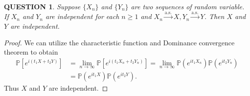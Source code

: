 \documentclass[12pt]{article}
\renewcommand{\(}{\left(}%
\renewcommand{\)}{\right)}%
\renewcommand{\[}{\left[}%
\renewcommand{\]}{\right]}%
\newcommand{\p}{\mathbb{P}}
\newtheorem{question}{QUESTION}[section]}
\newtheorem{proof}{Proof.}}
\begin{document}
  \begin{question}
   Suppose $\{X_n\}$ and $\{Y_n\}$ are two sequences of random variable. If $X_n$ and $Y_n$ are independent for each $n\geq 1$ and $X_n\overset{\mathrm{a.s.}}{ \to} X,Y_n\overset{\mathrm{a.s.}}{ \to} Y$. Then $X$ and $Y$ are independent.
  \end{question}
  \begin{proof}
   We can utilize the characteristic function and {\sffamily Dominance convergence theorem} to obtain
   \begin{equation*}
    \begin{split}
     \p\[e^{i(t_1X+t_2Y)}\]&=\lim_{n\to\infty}\p\[e^{i(t_1X_n+t_2Y_n)}\]=\lim_{n\to\infty}\p\(e^{it_1X_n}\)\p\(e^{it_2Y_n}\)\\
     &=\p\(e^{it_1X}\)\p\(e^{it_2Y}\).
    \end{split}
   \end{equation*}
   Thus $X$ and $Y$ are independent.
  \end{proof}
\end{document}
